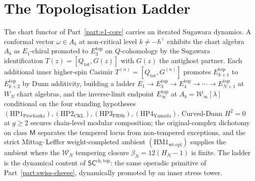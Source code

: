 \documentclass[11pt]{memoir}
\providecommand{\cW}{\mathcal{W}}
\newcommand{\SCchtop}{{\mathsf{SC}^{\mathrm{ch,top}}}}
\providecommand{\hypProchazka}{(\mathrm{HP1}_{\mathrm{Prochazka}})}
\providecommand{\hypCKL}{(\mathrm{HP2}_{\mathrm{CKL}})}
\providecommand{\hypPRSh}{(\mathrm{HP3}_{\mathrm{PRSh}})}
\providecommand{\hypYamada}{(\mathrm{HP4}_{\mathrm{Yamada}})}
\providecommand{\hypAmbientWtCpl}{(\mathrm{HM1}_{\mathrm{wt\text{-}cpl}})}
\begin{document}









\part{The Topologisation Ladder}
\label{part:topologisation-ladder}
\label{part:bbl-core} %
\label{part:seven-faces} %

\noindent
The chart functor of Part~\ref{part:e1-core} carries an iterated
Sugawara dynamics. A conformal vector $\omega \in A_b$ at non-critical
level $k \ne -h^\vee$ exhibits the chart algebra
$A_b$ as $E_1$-chiral promoted to $E_3^{\mathrm{top}}$ on
$Q$-cohomology by the Sugawara identification
$T(z) = [Q_{\mathrm{tot}}, G(z)]$ with $G(z)$ the antighost partner.
Each additional inner higher-spin Casimir
$T^{(n)} = [Q_{\mathrm{tot}}, G^{(n)}]$ promotes $E_{k+1}^{\mathrm{top}}$
to $E_{k+2}^{\mathrm{top}}$ by Dunn additivity, building a
ladder
$E_1 \to E_3^{\mathrm{top}} \to E_4^{\mathrm{top}} \to \cdots
 \to E_{N+1}^{\mathrm{top}}$
at $W_N$ chart algebras, and the inverse-limit endpoint
$E_\infty^{\mathrm{top}}$ at $A_b = \cW_\infty[\lambda]$ conditional
on the four standing hypotheses
$\hypProchazka, \hypCKL, \hypPRSh, \hypYamada$.
Curved-Dunn $H^2 = 0$ at $g \ge 2$ secures chain-level
modular composition; the original-complex dichotomy on class
$\mathsf{M}$ separates the tempered locus from non-tempered
exceptions, and the strict Mittag--Leffler weight-completed
ambient $\hypAmbientWtCpl$ supplies the ambient where the
$\cW_N$ tempering closure $\beta_N = 12(H_N - 1)$ is finite.
The ladder is the dynamical content of $\SCchtop$: the same
operadic primitive of Part~\ref{part:swiss-cheese}, dynamically
promoted by an inner stress tower.
\end{document}

